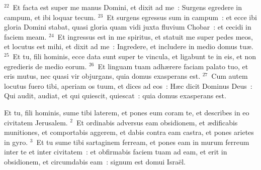 ${}^{22}$~Et facta est super me manus Domini, et dixit ad me~: Surgens egredere in campum, et ibi loquar tecum.
${}^{23}$~Et surgens egressus sum in campum~: et ecce ibi gloria Domini stabat, quasi gloria quam vidi juxta fluvium Chobar~: et cecidi in faciem meam.
${}^{24}$~Et ingressus est in me spiritus, et statuit me super pedes meos, et locutus est mihi, et dixit ad me~: Ingredere, et includere in medio domus tu\ae .
${}^{25}$~Et tu, fili hominis, ecce data sunt super te vincula, et ligabunt te in eis, et non egredieris de medio eorum.
${}^{26}$~Et linguam tuam adh\ae rere faciam palato tuo, et eris mutus, nec quasi vir objurgans, quia domus exasperans est.
${}^{27}$~Cum autem locutus fuero tibi, aperiam os tuum, et dices ad eos~: H\ae c dicit Dominus Deus~: Qui audit, audiat, et qui quiescit, quiescat~: quia domus exasperans est.

\bchapter
\lettrine[lines=3,image=true,loversize=0.05,lraise=-0.03]{E}{}t tu, fili hominis, sume tibi laterem, et pones eum coram te, et describes in eo civitatem Jerusalem.
${}^{2}$~Et ordinabis adversus eam obsidionem, et \ae dificabis munitiones, et comportabis aggerem, et dabis contra eam castra, et pones arietes in gyro.
${}^{3}$~Et tu sume tibi sartaginem ferream, et pones eam in murum ferreum inter te et inter civitatem~: et obfirmabis faciem tuam ad eam, et erit in obsidionem, et circumdabis eam~: signum est domui Isra\"el.


